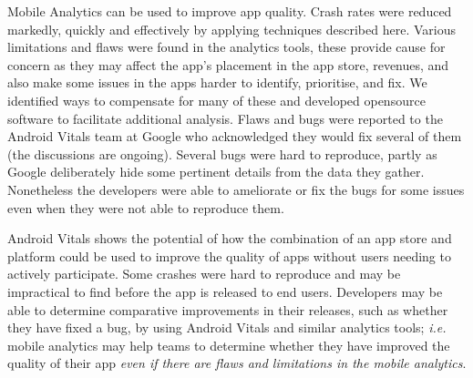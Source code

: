 \begin{SingleSpace}
Mobile Analytics can be used to improve app quality. Crash rates were reduced markedly, quickly and effectively by applying techniques described here. Various limitations and flaws were found in the analytics tools, these provide cause for concern as they may affect the app's placement in the app store, revenues, and also make some issues in the apps harder to identify, prioritise, and fix. We identified ways to compensate for many of these and developed opensource software to facilitate additional analysis. Flaws and bugs were reported to the Android Vitals team at Google who acknowledged they would fix several of them (the discussions are ongoing).
Several bugs were hard to reproduce, partly as Google deliberately hide some pertinent details from the data they gather. Nonetheless the developers were able to ameliorate or fix the bugs for some issues even when they were not able to reproduce them.

Android Vitals shows the potential of how the combination of an app store and platform could be used to improve the quality of apps without users needing to actively participate. Some crashes were hard to reproduce and may be impractical to find before the app is released to end users. Developers may be able to determine comparative improvements in their releases, such as whether they have fixed a bug, by using Android Vitals and similar analytics tools; \textit{i.e.} mobile analytics may help teams to determine whether they have improved the quality of their app \textit{even if there are flaws and limitations in the mobile analytics}.
\end{SingleSpace}
\newpage
